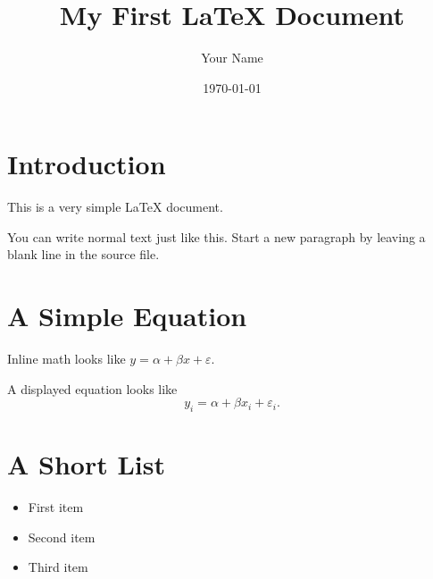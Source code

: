 \documentclass[11pt]{article}
\title{My First \LaTeX{} Document}
\author{Your Name}
\date{\today}
\begin{document}
\maketitle

\section{Introduction}
This is a very simple \LaTeX{} document.

You can write normal text just like this. Start a new paragraph by leaving a blank line in the source file.

\section{A Simple Equation}
Inline math looks like $y = \alpha + \beta x + \varepsilon$.

A displayed equation looks like
\begin{equation}
    y_i = \alpha + \beta x_i + \varepsilon_i.
\end{equation}

\section{A Short List}
\begin{itemize}
    \item First item
    \item Second item
    \item Third item
\end{itemize}
\end{document}
